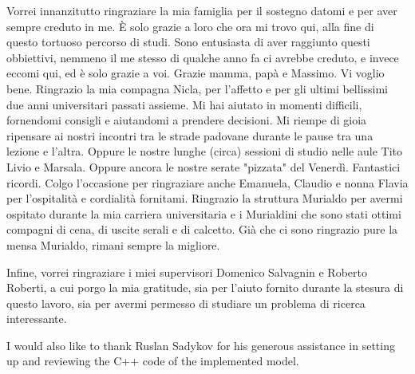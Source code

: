 \vspace{1.0cm}
{
	\setlength\parindent{0pt}

	Vorrei innanzitutto ringraziare la mia famiglia per il sostegno datomi e per aver sempre creduto in me.
	È solo grazie a loro che ora mi trovo qui, alla fine di questo tortuoso percorso di studi.
	Sono entusiasta di aver raggiunto questi obbiettivi, nemmeno il me stesso di qualche anno fa ci avrebbe creduto,
	e invece eccomi qui, ed è solo grazie a voi.
	Grazie mamma, papà e Massimo.
	Vi voglio bene.
	Ringrazio la mia compagna Nicla, per l'affetto e per gli ultimi bellissimi due anni universitari passati assieme.
	Mi hai aiutato in momenti difficili, fornendomi consigli e aiutandomi a prendere decisioni.
	Mi riempe di gioia ripensare ai nostri incontri tra le strade padovane durante le pause tra una lezione e l'altra.
	Oppure le nostre lunghe (circa) sessioni di studio nelle aule Tito Livio e Marsala.
	Oppure ancora le nostre serate "pizzata" del Venerdì.
	Fantastici ricordi.
	Colgo l'occasione per ringraziare anche Emanuela, Claudio e nonna Flavia per l'ospitalità
	e cordialità fornitami.
	Ringrazio la struttura Murialdo per avermi ospitato durante la mia carriera universitaria e
	i Murialdini che sono stati ottimi compagni di cena, di uscite serali e di calcetto.
	Già che ci sono ringrazio pure la mensa Murialdo, rimani sempre la migliore.

	\medskip

	Infine, vorrei ringraziare i miei supervisori Domenico Salvagnin e Roberto Roberti,
	a cui porgo la mia gratitude, sia per l'aiuto fornito durante la stesura di questo lavoro,
	sia per avermi permesso di studiare un problema di ricerca interessante.

	I would also like to thank Ruslan Sadykov for his generous assistance in setting up \bapcod{} and reviewing the C++ code of the implemented model.

}


\vspace{1cm}

{
	\setlength\parindent{0pt}

	\textit{\UnivPlace}\\
	\textit{\GraduationDate}    \hfill    \AuthorName{} \AuthorSurname{}
}
